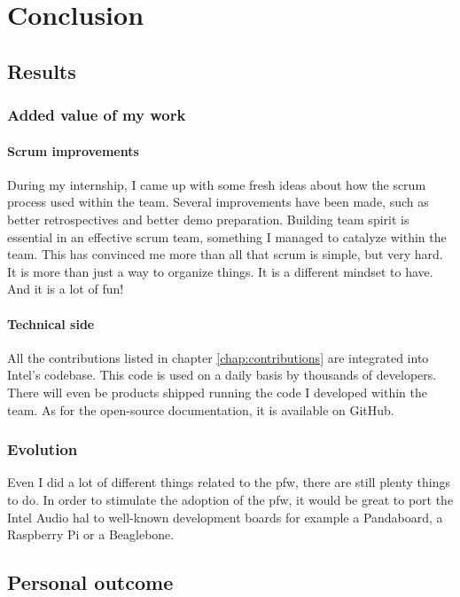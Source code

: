 \chapter{Conclusion}

\section{Results}

\subsection{Added value of my work}
\subsubsection{Scrum improvements}
During my internship, I came up with some fresh ideas about how the \gls{scrum} process used within the team.
Several improvements have been made, such as better retrospectives and better demo preparation.
Building team spirit is essential in an effective \gls{scrum} team, something I managed to catalyze within the team.
This has convinced me more than all that \gls{scrum} is simple, but very hard. It is more than just a way to organize
things. It is a different mindset to have. And it is a lot of fun!

\subsubsection{Technical side}
All the contributions listed in chapter \ref{chap:contributions} are integrated into Intel's codebase.
This code is used on a daily basis by thousands of developers. There will even be products shipped running the
code I developed within the team.
As for the open-source documentation, it is available on GitHub.

\subsection{Evolution}
Even I did a lot of different things related to the \gls{pfw}, there are still plenty things to do.
In order to stimulate the adoption of the \gls{pfw}, it would be great to
port the Intel Audio \gls{hal} to well-known development boards for example a
Pandaboard, a Raspberry Pi or a Beaglebone.


\section{Personal outcome}

